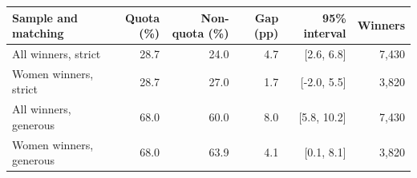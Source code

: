\begin{tabular}{lrrrrr}
\toprule
Sample and matching & Quota (\%) & Non-quota (\%) & Gap (pp) & 95\% interval & Winners \\
\midrule
All winners, strict & 28.7 & 24.0 & 4.7 & [2.6, 6.8] & 7,430 \\
Women winners, strict & 28.7 & 27.0 & 1.7 & [-2.0, 5.5] & 3,820 \\
All winners, generous & 68.0 & 60.0 & 8.0 & [5.8, 10.2] & 7,430 \\
Women winners, generous & 68.0 & 63.9 & 4.1 & [0.1, 8.1] & 3,820 \\
\bottomrule
\end{tabular}
